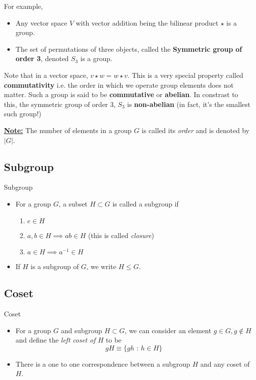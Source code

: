 \documentclass[11pt]{article}
\begin{document}
\vskip 0.5cm
For example,
\begin{itemize}
  \item Any vector space $V$ with vector addition being the bilinear product $\star$ is a group.
  \item The set of permutations of three objects, called the \textbf{Symmetric group of order 3}, denoted $S_3$ is a group.
\end{itemize}

\vskip 0.5cm
Note that in a vector space, $v \star w = w \star v$. This is a very special property called \textbf{commutativity} i.e. the order in which we operate group elements does not matter. Such a group is said to be \textbf{commutative} or \textbf{abelian}. In constrast to this, the symmetric group of order 3, $S_3$ is \textbf{non-abelian} (in fact, it's the smallest such group!)

\vskip 0.5cm
\underline{\textbf{Note:}} The number of elements in a group $G$ is called its \emph{order} and is denoted by $\lvert G \rvert$.

\vskip 1cm
\subsection{Subgroup}

\vskip 0.5cm
\begin{mathdefinitionbox}{Subgroup}
  \vskip 0.5cm
  \begin{itemize}
    \item   For a group $G$, a subset $H \subset G$ is called a subgroup if 
    \begin{enumerate}[label=(\alph*)]
      \item $e \in H$
      \item $a, b \in H \implies ab \in H$ (this is called \emph{closure})
      \item $a \in H \implies a^{-1} \in H$ 
    \end{enumerate}

    \item If $H$ is a subgroup of $G$, we write $H \leq G$.
  \end{itemize}
\end{mathdefinitionbox}



\vskip 1cm
\subsection{Coset}

\vskip 0.5cm
\begin{mathdefinitionbox}{Coset}
\vskip 0.5cm
  \begin{itemize}
    \item For a group $G$ and subgroup $H \subset G$, we can consider an element $g \in G, g \not\in H$ and define the \emph{left coset of $H$} to be
    \[ gH \equiv \{ gh \text{ : } h \in H \} \]

    \item There is a one to one correspondence between a subgroup $H$ and any coset of $H$.
  \end{itemize}
\end{mathdefinitionbox}
\end{document}
